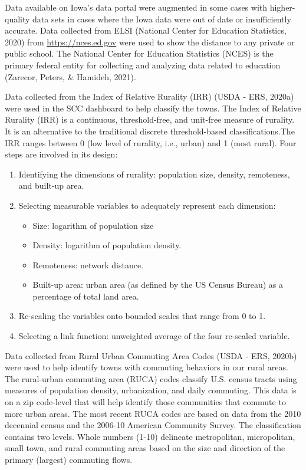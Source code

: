 \documentclass[print]{nuthesis}
\begin{document}
Data available on Iowa's data portal were augmented in some cases with higher-quality data sets in cases where the Iowa data were out of date or insufficiently accurate.
Data collected from ELSI (National Center for Education Statistics, 2020) from \url{https://nces.ed.gov} were used to show the distance to any private or public school. The National Center for Education Statistics (NCES) is the primary federal entity for collecting and analyzing data related to education (Zarecor, Peters, \& Hamideh, 2021).

Data collected from the Index of Relative Rurality (IRR) (USDA - ERS, 2020a) were used in the SCC dashboard to help classify the towns. The Index of Relative Rurality (IRR) is a continuous, threshold-free, and unit-free measure of rurality. It is an alternative to the traditional discrete threshold-based classifications.The IRR ranges between 0 (low level of rurality, i.e., urban) and 1 (most rural). Four steps are involved in its design:

\begin{enumerate}
\item Identifying the dimensions of rurality: population size, density, remoteness, and built-up area.
\item Selecting measurable variables to adequately represent each dimension:
    \begin{itemize}
        \item Size: logarithm of population size
        \item Density: logarithm of population density.
        \item Remoteness: network distance.
        \item Built-up area: urban area (as defined by the US Census Bureau) as a percentage of total land area.
    \end{itemize}
\item Re-scaling the variables onto bounded scales that range from 0 to 1.
\item Selecting a link function: unweighted average of the four re-scaled variable.
\end{enumerate}

Data collected from Rural Urban Commuting Area Codes (USDA - ERS, 2020b) were used to help identify towns with commuting behaviors in our rural areas. The rural-urban commuting area (RUCA) codes classify U.S. census tracts using measures of population density, urbanization, and daily commuting. This data is on a zip code-level that will help identify those communities that commute to more urban areas. The most recent RUCA codes are based on data from the 2010 decennial census and the 2006-10 American Community Survey. The classification contains two levels. Whole numbers (1-10) delineate metropolitan, micropolitan, small town, and rural commuting areas based on the size and direction of the primary (largest) commuting flows.
\end{document}
